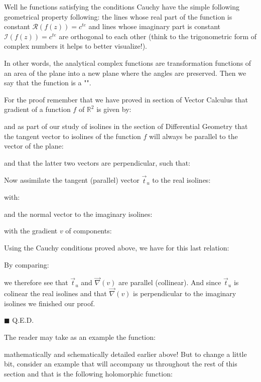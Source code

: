 	\begin{theorem}
	Well he functions satisfying the conditions Cauchy have the simple following geometrical property following: the lines whose real part of the function is constant $\mathcal{R}(f(z))=c^{te}$ and lines whose imaginary part is constant $\mathcal{I}(f(z))=c^{te}$  are orthogonal to each other (think to the trigonometric form of complex numbers it helps to better visualize!).
	
	In other words, the analytical complex functions are transformation functions of an area of the plane into a new plane where the angles are preserved. Then we say that the function is a "".
	\end{theorem}
	
	\begin{dem}
	For the proof remember that we have proved in section of Vector Calculus that gradient of a function $f$ of $\mathbb{R}^2$ is given by:
	
	and as part of our study of isolines in the section of Differential Geometry that the tangent vector to isolines of the function $f$ will always be parallel to the vector of the plane:
	
	and that the latter two vectors are perpendicular, such that:
	
	Now assimilate the tangent (parallel) vector $\vec{t}_u$ to the real isolines:
	
	with:
	
	and the normal vector to the imaginary isolines:
	
	with the gradient $v$ of components:
	
	Using the Cauchy conditions proved above, we have for this last relation:
	
	By comparing:
	
	we therefore see that $\vec{t}_u$ and $\vec{\nabla}(v)$ are parallel (collinear). And since $\vec{t}_u$ is colinear the real isolines and that $\vec{\nabla}(v)$  is perpendicular to the imaginary isolines we finished our proof.
	\begin{flushright}
		$\blacksquare$  Q.E.D.
	\end{flushright}
	\end{dem}
	The reader may take as an example the function:
	
	mathematically and schematically detailed earlier above! But to change a little bit, consider an example that will accompany us throughout the rest of this section and that is the following holomorphic function:
	
